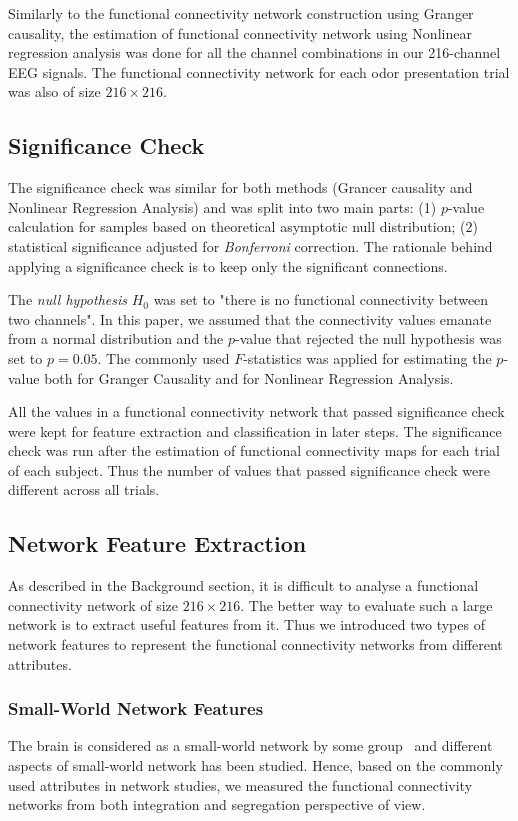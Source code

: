 Similarly to the functional connectivity network construction using Granger causality, the estimation of functional connectivity network using Nonlinear regression analysis was done for all the channel combinations in our 216-channel EEG signals. The functional connectivity network for each odor presentation trial was also of size $216 \times 216$.

\subsection{Significance Check}
The significance check was similar for both methods (Grancer causality and Nonlinear Regression Analysis) and was split into two main parts: (1) $p$-value calculation for samples based on theoretical asymptotic null distribution; (2) statistical significance adjusted for \emph{Bonferroni} correction. The rationale behind applying a significance check is to keep only the significant connections. 

The \emph{null hypothesis} $H_0$ was set to "there is no functional connectivity between two channels". In this paper, we assumed that the connectivity values emanate from a normal distribution and the $p$-value that rejected the null hypothesis was set to $p=0.05$. The commonly used $F$-statistics was applied for estimating the $p$-value both for Granger Causality and for Nonlinear Regression Analysis.

All the values in a functional connectivity network that passed significance check were kept for feature extraction and classification in later steps. The significance check was run after the estimation of functional connectivity maps for each trial of each subject. Thus the number of values that passed significance check were different across all trials. 


\subsection{Network Feature Extraction}
As described in the Background section, it is difficult to analyse a functional connectivity network of size $216 \times 216$. The better way to evaluate such a large network is to extract useful features from it. Thus we introduced two types of network features to represent the functional connectivity networks from different attributes. 

\subsubsection{Small-World Network Features}
The brain is considered as a small-world network by some group~\cite{bassett2006small} and different aspects of small-world network has been studied. Hence, based on the commonly used attributes in network studies, we measured the functional connectivity networks from both integration and segregation perspective of view. 

